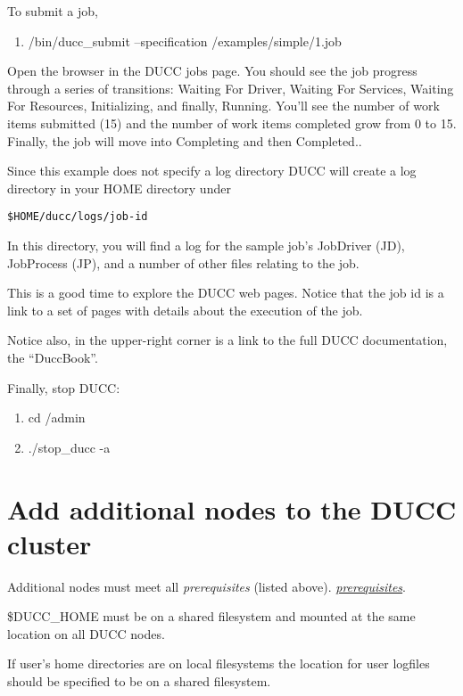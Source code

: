   To submit a job,
  \begin{enumerate}
    \item \duccruntime/bin/ducc\_submit --specification \duccruntime/examples/simple/1.job
    \end{enumerate}
    
    Open the browser in the DUCC jobs page.  You should see the job progress through a series of
    transitions: Waiting For Driver, Waiting For Services, Waiting For Resources, Initializing, and
    finally, Running.  You'll see the number of work items submitted (15) and the number of work
    items completed grow from 0 to 15.  Finally, the job will move into Completing and then
    Completed..

    Since this example does not specify a log directory DUCC will create a log directory in your HOME directory under 
\begin{verbatim}
$HOME/ducc/logs/job-id
\end{verbatim}

    In this directory, you will find a log for the sample job's JobDriver (JD), JobProcess (JP), and
    a number of other files relating to the job.

    This is a good time to explore the DUCC web pages.  Notice that the job id is a link to a set of
    pages with details about the execution of the job.

    Notice also, in the upper-right corner is a link to the full DUCC documentation, the ``DuccBook''.

    Finally, stop DUCC:
    \begin{enumerate}
      \item cd \duccruntime/admin
      \item./stop\_ducc -a
      \end{enumerate}
      

\section{Add additional nodes to the DUCC cluster}
   Additional nodes must meet all 
   \ifdefined\DUCCSTANDALONE
   {\em prerequisites} (listed above).
   \else
   \hyperref[sec:install.prerequisites]{\em prerequisites}.
   \fi

   \$DUCC\_HOME must be on a shared filesystem and mounted at the same location
   on all DUCC nodes.

   If user's home directories are on local filesystems the location for user logfiles
   should be specified to be on a shared filesystem. 

